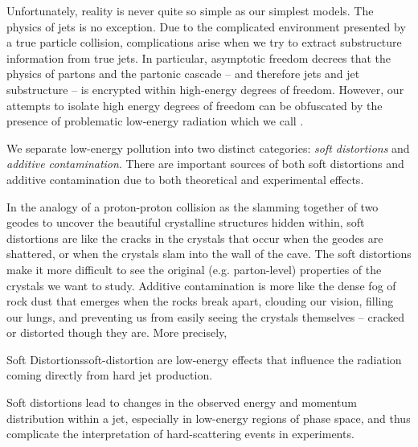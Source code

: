 Unfortunately, reality is never quite so simple as our simplest models.
%
The physics of jets is no exception.
%
Due to the complicated environment presented by a true particle collision, complications arise when we try to extract substructure information from true jets.
%
In particular, asymptotic freedom decrees that the physics of partons and the partonic cascade -- and therefore jets and jet substructure -- is encrypted within high-energy degrees of freedom.
%
However, our attempts to isolate high energy degrees of freedom can be obfuscated by the presence of problematic low-energy radiation which we call .

We separate low-energy pollution into two distinct categories:
%
\textit{soft distortions} and \textit{additive contamination}.
%
There are important sources of both soft distortions and additive contamination due to both theoretical and experimental effects.

In the analogy of a proton-proton collision as the slamming together of two geodes to uncover the beautiful crystalline structures hidden within, soft distortions are like the cracks in the crystals that occur when the geodes are shattered, or when the crystals slam into the wall of the cave.
%
The soft distortions make it more difficult to see the original (e.g. parton-level) properties of the crystals we want to study.
%
Additive contamination is more like the dense fog of rock dust that emerges when the rocks break apart, clouding our vision, filling our lungs, and preventing us from easily seeing the crystals themselves -- cracked or distorted though they are.
%
More precisely,

\begin{definitionbox}{Soft Distortions}{soft-distortion}
     are low-energy effects that influence the radiation coming directly from hard jet production.

    Soft distortions lead to changes in the observed energy and momentum distribution within a jet, especially in low-energy regions of phase space, and thus complicate the interpretation of hard-scattering events in experiments.
\end{definitionbox}



